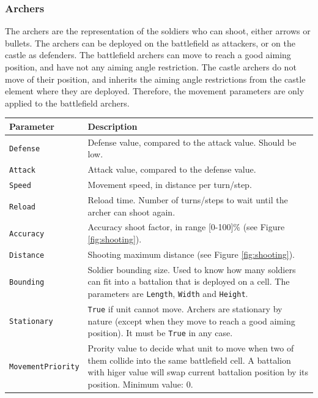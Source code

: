 \documentclass[tog]{acmsiggraph}
\begin{document}
 



\subsubsection{Archers}
\label{sec:settingsarchers}

The archers are the representation of the soldiers who can shoot, either arrows or bullets.
The archers can be deployed on the battlefield as attackers, or on the castle as defenders. 
The battlefield archers can move to reach a good aiming position, and have not any aiming angle restriction.
The castle archers do not move of their position, and inherits the aiming angle restrictions from the castle element where they are deployed.
Therefore, the movement parameters are only applied to the battlefield archers.


\begin{tabularx}{0.48\textwidth}{ |X|X| }
\hline 
\textbf{Parameter} & \textbf{Description} \\[0.15cm]
 \hline
 \texttt{Defense} & Defense value, compared to the attack value. Should be low. \\
 \hline
 \texttt{Attack} & Attack value, compared to the defense value. \\
 \hline
 \texttt{Speed} & Movement speed, in distance per turn/step. \\
 \hline 
 \texttt{Reload} & Reload time. Number of turns/steps to wait until the archer can shoot again. \\
 \hline 
 \texttt{Accuracy} & Accuracy shoot factor, in range [0-100]\% (see Figure \ref{fig:shooting}). \\
 \hline 
 \texttt{Distance} & Shooting maximum distance (see Figure \ref{fig:shooting}).\\
 \hline 
 \texttt{Bounding} & Soldier bounding size. Used to know how many soldiers can fit into a battalion that is deployed on a cell. The parameters are \texttt{Length}, \texttt{Width} and \texttt{Height}. \\
 \hline 
 \texttt{Stationary} & \texttt{True} if unit cannot move. Archers are stationary by nature (except when they move to reach a good aiming position). It must be \texttt{True} in any case. \\
 \hline 
 \texttt{MovementPriority} & Prority value to decide what unit to move when two of them collide into the same battlefield cell. A battalion with higer value will swap current battalion position by its position. Minimum value: 0. \\
 \hline 
\end{tabularx}  
 
\end{document}
